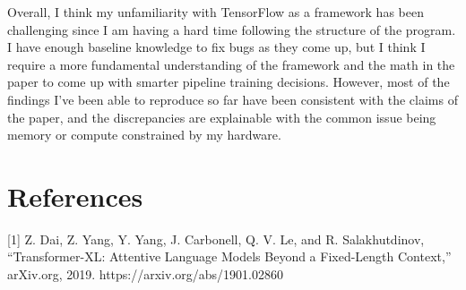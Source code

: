 \documentclass[11pt]{article}
\begin{document}
Overall, I think my unfamiliarity with TensorFlow as a framework has been challenging since I am having a hard time following the structure of the program. I have enough baseline knowledge to fix bugs as they come up, but I think I require a more fundamental understanding of the framework and the math in the paper to come up with smarter pipeline training decisions. However, most of the findings I've been able to reproduce so far have been consistent with the claims of the paper, and the discrepancies are explainable with the common issue being memory or compute constrained by my hardware.

\section{References}

[1] Z. Dai, Z. Yang, Y. Yang, J. Carbonell, Q. V. Le, and R. Salakhutdinov, “Transformer-XL: Attentive Language Models Beyond a Fixed-Length Context,” arXiv.org, 2019. https://arxiv.org/abs/1901.02860
\end{document}
